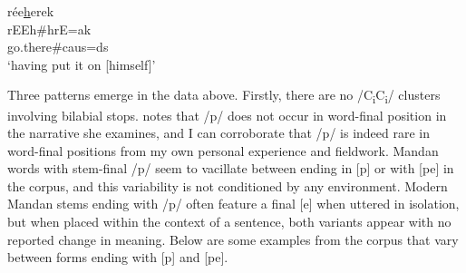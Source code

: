 \begin{exe}
\begin{xlist}
	\item\label{CClenitionex7} \glll rée\uline{h}erek\\
	rEEh\#hrE=ak\\
	\textnormal{go.there}\#caus=ds\\
	\glt `having put it on [himself]' \citep[16]{hollow1973a}

	\end{xlist}

\end{exe}

 Three patterns emerge in the data above. Firstly, there are no /C\textsubscript{i}C\textsubscript{i}/ clusters involving bilabial stops. \citet[10]{torres2013a} notes that /p/ does not occur in word-final position in the narrative she examines, and I can corroborate that /p/ is indeed rare in word-final positions from my own personal experience and fieldwork. Mandan words with stem-final /p/ seem to vacillate between ending in [p] or with [pe] in the corpus, and this variability is not conditioned by any environment. Modern Mandan stems ending with /p/ often feature a final [e] when uttered in isolation, but when placed within the context of a sentence, both variants appear with no reported change in meaning. Below are some examples from the corpus that vary between forms ending with [p] and [pe].

